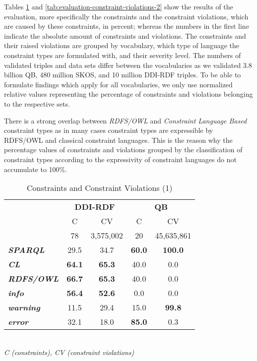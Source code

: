 \documentclass{llncs}
\begin{document}
Tables \ref{tab:evaluation-constraint-violations-1} and \ref{tab:evaluation-constraint-violations-2} show the results of the evaluation, more specifically the constraints and the constraint violations, which are caused by these constraints, in percent; whereas the numbers in the first line indicate the absolute amount of constraints and violations. The constraints and their raised violations are grouped by vocabulary, which type of language the constraint types are formulated with, and their severity level.
The numbers of validated triples and data sets differ between the vocabularies
as we validated 3.8 billion QB, 480 million SKOS, and 10 million DDI-RDF triples.
To be able to formulate findings which apply for all vocabularies, 
we only use normalized relative values representing the percentage of constraints and violations belonging to the respective sets. 

There is a strong overlap between \emph{RDFS/OWL} and \emph{Constraint Language Based} constraint types as in many cases constraint types are expressible by RDFS/OWL and classical constraint languages. This is the reason why the percentage values of constraints and violations grouped by the classification of constraint types according to the expressivity of constraint languages do not accumulate to 100\%. 

\begin{table}[H]
		\scriptsize
    \begin{center}
		\caption{Constraints and Constraint Violations (1)}
		\label{tab:evaluation-constraint-violations-1}
    \begin{tabular}{@{}lcc|cc@{}}
    \multirow{2}{*}{} &
      \multicolumn{2}{c}{\textbf{DDI-RDF}} &
      \multicolumn{2}{c}{\textbf{QB}} \\
    \textbf{} & C & CV & C & CV \\
    \hline
		 & 78 & 3,575,002 & 20 & 45,635,861 \\
		\hline
		\textbf{\emph{SPARQL}} & 29.5 & 34.7 & \textbf{60.0} & \textbf{100.0} \\
		\textbf{\emph{CL}} & \textbf{64.1} & \textbf{65.3} & 40.0 & 0.0 \\
		\textbf{\emph{RDFS/OWL}} & \textbf{66.7} & \textbf{65.3} & 40.0 & 0.0 \\
		\hline
		\textbf{\emph{info}} & \textbf{56.4} & \textbf{52.6} & 0.0 & 0.0 \\
		\textbf{\emph{warning}} & 11.5 & 29.4 & 15.0 & \textbf{99.8} \\
		\textbf{\emph{error}} & 32.1 & 18.0 & \textbf{85.0} & 0.3 \\
    \bottomrule
    \end{tabular}
    \\ \emph{C (constraints), CV (constraint violations)}
    \end{center}
\end{table}
\end{document}
